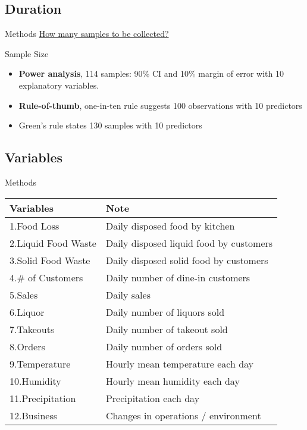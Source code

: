 \documentclass{beamer}\usepackage[]{graphicx}\usepackage[]{xcolor}
\begin{document}
\subsection{Duration}
\begin{frame}{Methods}
    \underline{How many samples to be collected?}
    \begin{block}{Sample Size}
        \begin{itemize}
            \item \textbf{Power analysis}, 
            114 samples: 90\% CI and 10\% margin of error with 10 explanatory variables.
            \item \textbf{Rule-of-thumb}, one-in-ten rule suggests 100 observations with 10 predictors\cite{Harrell1984-te}
            \item Green's rule states 130 samples with 10 predictors\cite{Green1991-aj}
        \end{itemize}
    \end{block}
\end{frame}

\subsection{Variables}
\begin{frame}{Methods}
    \begin{table}[]
    \small
        \begin{tabular}{ll}
            \hline
            Variables & Note \\ \hline
            1.Food Loss & Daily disposed food by kitchen \\
            2.Liquid Food Waste & Daily disposed liquid food by customers \\
            3.Solid Food Waste & Daily disposed solid food by customers \\
            4.\# of Customers & Daily number of dine-in customers \\
            5.Sales & Daily sales \\
            6.Liquor & Daily number of liquors sold \\
            7.Takeouts & Daily number of takeout sold \\
            8.Orders & Daily number of orders sold \\
            9.Temperature & Hourly mean temperature each day \\
            10.Humidity & Hourly mean humidity each day \\
            11.Precipitation & Precipitation each day \\
            12.Business & Changes in operations / environment\\ \hline
        \end{tabular}
    \end{table}
\end{frame}
\end{document}
